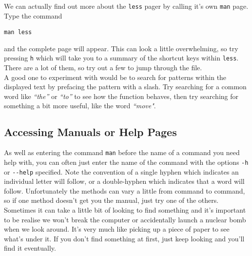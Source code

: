 \documentclass[a4paper,12pt,twoside]{memoir}
\begin{document}
\begin{bonus}
We can actually find out more about the \texttt{less} pager by calling it's own \texttt{man} page.
Type the command \\
\begin{lstlisting}
man less
\end{lstlisting}
 and the complete page will appear.
This can look a little overwhelming, so try pressing \texttt{h} which will take you to a summary of the shortcut keys within \texttt{less}.
There are a lot of them, so try out a few to jump through the file. \\

A good one to experiment with would be to search for patterns within the displayed text by prefacing the pattern with a slash.
Try searching for a common word like \textit{``the''} or \textit{``to''} to see how the function behaves, then try searching for something a bit more useful, like the word \textit{``move"}. \\
\end{bonus}

\subsection{Accessing Manuals or Help Pages}
\begin{information}
As well as entering the command \texttt{man} before the name of a command you need help with, you can often just enter the name of the command with the options \texttt{-h} or \texttt{-{}-help} specified.
Note the convention of a single hyphen which indicates an individual letter will follow, or a double-hyphen which indicates that a word will follow.
Unfortunately the methods can vary a little from command to command, so if one method doesn't get you the manual, just try one of the others.\\

Sometimes it can take a little bit of looking to find something and it's important to be realise we won't break the computer or accidentally launch a nuclear bomb when we look around.
It's very much like picking up a piece of paper to see what's under it.
If you don't find something  at first, just keep looking and you'll find it eventually.\\
\end{information}
\end{document}
